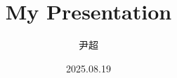 \usepackage{blindtext}
\usepackage{varsfromjobname}
\usepackage{amsmath}
\usepackage{array}

\usetheme{\gettwofromjobname}

\title{My Presentation}
\author{尹超}
\date{2025.08.19}


